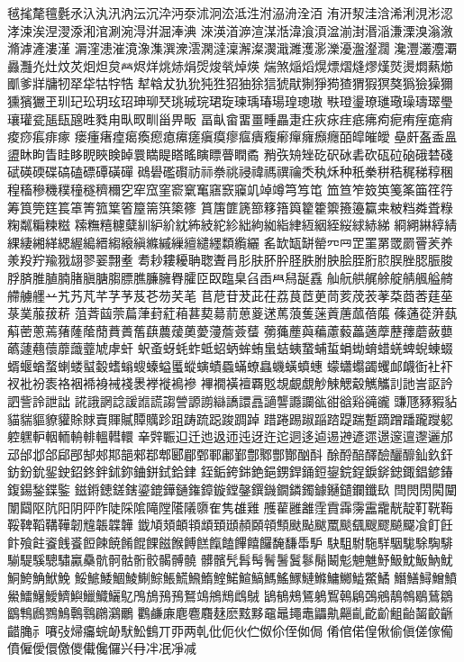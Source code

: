 毧毮氂氊氎氶𣱿汍汛汭沄沉㳃沔沗沭泂㳒泜泩泭𣴀洀洤洦
洧汧洯洼浛浠浰涀涁涊涍涑涘𣵀𣷺𣷹𣷓涫涮涴淂洴淈淎淟
淶渶渞㴑渲湈湉湋湌湏湓湔湗湣㴞溓溧溴滃漵滫滹滻漊漌
漘漥漶漼𣽾潒潗潠潨澐澖澾澟澥澯㵤濈濉濩𤂖濼瀀瀊瀣𤄃
瀺灃灇灋㶚灥灩灮灶炆炗𤇆炟炱𤇾烬烊烑焃焆焈焌㷀焯煐
煓煞㷔熖熀熛熠熢熮熯𤎼燙燜爇㸅爴爹牂牗牣𤘩牮牯牸牿
犎𤚥犮犰狁㹠狌㹦㹨狳狺猇猒猘猙㺃猹猬猳猽獒㺔獫𤢖獮
獯獱玁玊玔玘玜玥玹玿珅珋珡珧珹琓珺琁瑓瑀瑃瑒瑝璁璈
𤩍璒璗璙璡璥璪璹璻璺瓖瓘瓫𤭖瓺𤭯甠甤甪㽗𤰖甽甾畀畈
畐畒畲畱畺畽畾疌㽵疢㽷疰疷疿痀痆痏痓痝痟痠痧痮痱瘃
瘘瘇瘏㾮𤸎瘓瘛瘜𤸷瘥瘨瘼瘳𤹪㿉癁𤺋癉癕㿗癮皕皡皠皧
皨皯𥁊盉𥁕盨𥄢眗眚眭眵𥆩䀹𥇥𥇍睘𥈞睼𥉌䁘瞚瞟瞢瞤矞
矟矤矪矬矻𥐮砅砉砍砙砬硇硪𥓙碊碔碤碝碟碻磕磦磹磺磾
𥖧礐礛礥祊祘䄅祧祲禕禡禩禴秂秇秌种秖䅈𥞩𥞴䅏稊稕稛
䅣稸穇穖穙穜穟穧穪穵窂窊窐窬𥧔䆴窹窾䆿竌竨竴𥫤𥫣𥫱
笽笪笮笯䇦䇳筿筁䇮筕筹筤筦筳𥮲䈇箐箛䈎箵箼篅篊𥱋𥱤
篔篖篚篪篰簃簎籅籊籗籞籡籩籯𥸮𥹖𥹥粦𥹢粶粷𥻘糄𥻂糍
𥻨𥼣糦𥽜糵紃䋆紒紞𥿠𥿔紽紾絀絇𦀌𥿻䋖絚絪絰䋝絿𦀗綈
綗𦁠綝綧綪綶緀緗緙緦䌂𦃭縉縐縗縝縧縬繅繵繾纆纇䌫纚
䍃缼缻缾罃㓁𦉰𦊆罣罤罭罽罾羐养𣴎羖羜羭𦐂翃翏翣翲耊
耈耖耬耰聃聦聻肙肜肤肧肸𦙾胅胕胦脍胵胻䏮脵脞䏰脤脧
脬𦜝脽䐈腩䐗䐜膅䐢膘膲臁臃臖臛𦣝臤𦣪臬臽臿𦥯舄𦧝舙
舢𦨞舼艉艅𦩘䑶䑺艗𦪌艜艣𦪷䒑艽艿芃芊芓芧芨芲芴芺芼
苢苨苷茇茈茌荔茛茝茰茼荄荗䒾䓔䒳莔莕莛莝菉菐菔菝菥
菹萕𦱳萗萹葏葑葒葙葚葜𦳝葥葸葼蒁䔍蒗蒦蒾䔈蓎蓏蓓𦹥
蓧蓪蓯蓱蓺蔛蔤蔥蔫蕏蕯䕃蕑蕡蕢𦾔蕻蕽蕿薁薆薓薝薟𦿸
𦿶𦿷薼藇藊藘藙藟藡藦藶蘀蘑蘞蘡蘤蘧𧄍蘹蘼𧄹虀虓虖虷
蚇蚉蚜蚝蚱蚳蛁蛃蛑蛕蛗蛣蛦䖸蜅蜇蜎蜐蜟蜡蜣蜱蜺蝀蝃
蝑蝘蝤蝥蝲蝼𧏛𧏚螧螉螋螓螠𧏾䗥螾𧐐蟁蟎蟟𧑉蟣蟥蟦蟪
蠓蠨蠮蠲蠼䘏衊衘𧘕𧘔衩𧘱衯袠袼裀𧚓裑裓䙁褁𧜎褷𧜣襂
襅襉𧝒襢覉覐覟覰覷觘觫䚡觳觽觿䚯訑訔𧦅訡訵訾詅詍詘
誮誐誷諗諼𧪄謊謅謍謜謭䜌譑譞譶讁讋讔讕谹𧮳谽𧮾𧯇豅
豏豗豩豭𧲸貓貒貙䝤貛賖賕𧶠賱𧸐贉贎跈跙踌䟽跽踆𨂊踔
踖踡踢踧𨂻䠖踶踹蹔蹢蹭蹯躘躞躵躻𨊂䡎𨋳輀輈輫轀轊轘
𨐌辤辴𨑕迁迆﨤迊迍迓迕迱迵迻逌逷𨕫遃遝𨗈𨗉邅邌邐邡
䢵邰邶郃郈𨛗郜郟𨛺郶郲鄀郫郾郿鄄鄆鄘鄞鄷鄹酆酇酗酙
酴酹醅醳醶釃釄𨥉𨥆釬鈁鈖鈗𨥫鉂鉊鉖鉡鉥鉨𨦈鉼鉽鉿銉
銍銗銙銟銫𨦺𨦻銲銿鋀鋆鋎鋥錑𨨞𨨩鋷錩𨩱𨩃鍑鍚鍫鍱鍳
鎡𨪙𨫍鎈鎋鎏鎞鏵𨫤𨫝鏱鏇鏜鏧鐉鐖鐗鏻鐲鐻𨯁𨯯鑭鑯镹
閆閌閍𨴐𨵱闈𨷻𨸟阬阳阴𨸶阼陡𨺉隂𨻫隚𨼲䧧隳隺隽䧺𨿸
雘雚雝䨄霔霣䨩霶靁靇靗靛靪𩊠𩊱鞖鞞鞱鞲鞾韌韑韔韘韡
韱頄頍頔頖䪼𩒐頲頳頥顇顦颫颭颰𩗏颷颻颼飂飇飋飡飣飪
飰飱飳餈䬻𩛰餖餗𩜙餚餛餜𩝐餱餺餻餼饁饆饎饠馣馦馽馿
駃駔駙駞𩣆駰駹駼騊騑騚騠騱驄驌驘䯂骯䯊骷䯒骹𩩲髆髐
髒髕髠髥髩鬌鬐鬒鬖鬜鬫鬽䰠魋魣魥魫魬魶魷鮦鮬𩷛鮲鮸
鮾鯳鯘鯝鯪鯯鯮𩸕𩺊𩹉鰖鰘鰙鰚鰝鰢鰩𩻄鰱鰷鱅鱜𩻩鱉鱊
𩻛鱔鱘鱛鱝鱟鱩鱪鱫鱭鱮鱲鱵鱺鳦鳲鴋𩿎𩿗鴑鴗鴘𪀯䳄𪀚
鴲䳑鵊鵟鵢𪃹𪂂鵳鵶鵷鶄鶙鶡鶿鶵鶹鶽鷉鷚鷠鷣䴇鸊鸂鸍
鸜鹻𢈘麀麅麛𪎌麽𪐷黟黿鼂䵷鼃鼺鼽齆齓齕齘𪗱齝𪘂齩齭
齰𪚲⺬㘔㢭㷌㿜䖾䘐䭾䰸䳡丌丣两乹仳伌伙伫伮伱侄侞侷
倄倌偌偟偢偷傎傞傢僃僨僱僾儇儌儍儎儳儸兴冄冸冺凈减
